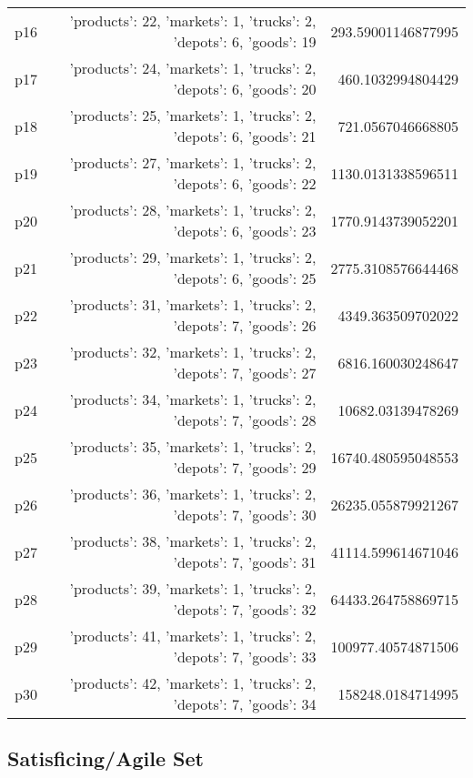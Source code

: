\documentclass{article}
\begin{document}
\begin{center}
\begin{tabular}{r|r|r}
  p16&{'products': 22, 'markets': 1, 'trucks': 2, 'depots': 6, 'goods': 19}&293.59001146877995\\
  p17&{'products': 24, 'markets': 1, 'trucks': 2, 'depots': 6, 'goods': 20}&460.1032994804429\\
  p18&{'products': 25, 'markets': 1, 'trucks': 2, 'depots': 6, 'goods': 21}&721.0567046668805\\
  p19&{'products': 27, 'markets': 1, 'trucks': 2, 'depots': 6, 'goods': 22}&1130.0131338596511\\
  p20&{'products': 28, 'markets': 1, 'trucks': 2, 'depots': 6, 'goods': 23}&1770.9143739052201\\
  p21&{'products': 29, 'markets': 1, 'trucks': 2, 'depots': 6, 'goods': 25}&2775.3108576644468\\
  p22&{'products': 31, 'markets': 1, 'trucks': 2, 'depots': 7, 'goods': 26}&4349.363509702022\\
  p23&{'products': 32, 'markets': 1, 'trucks': 2, 'depots': 7, 'goods': 27}&6816.160030248647\\
  p24&{'products': 34, 'markets': 1, 'trucks': 2, 'depots': 7, 'goods': 28}&10682.03139478269\\
  p25&{'products': 35, 'markets': 1, 'trucks': 2, 'depots': 7, 'goods': 29}&16740.480595048553\\
  p26&{'products': 36, 'markets': 1, 'trucks': 2, 'depots': 7, 'goods': 30}&26235.055879921267\\
  p27&{'products': 38, 'markets': 1, 'trucks': 2, 'depots': 7, 'goods': 31}&41114.599614671046\\
  p28&{'products': 39, 'markets': 1, 'trucks': 2, 'depots': 7, 'goods': 32}&64433.264758869715\\
  p29&{'products': 41, 'markets': 1, 'trucks': 2, 'depots': 7, 'goods': 33}&100977.40574871506\\
  p30&{'products': 42, 'markets': 1, 'trucks': 2, 'depots': 7, 'goods': 34}&158248.0184714995
                            \end{tabular}
                            \end{center}
                    

                                \subsection*{Satisficing/Agile Set}
                                
\end{document}
